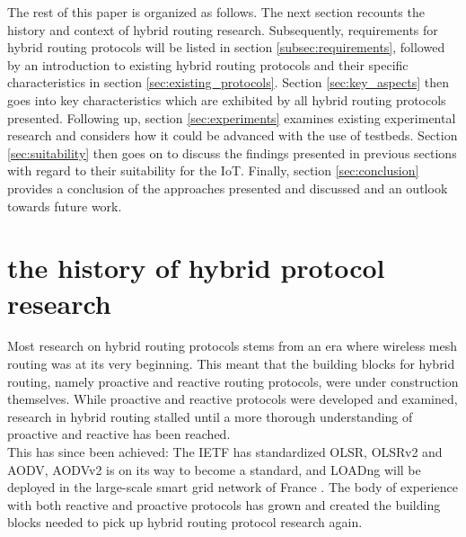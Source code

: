 \documentclass[a4paper,10pt]{scrartcl}
\begin{document}
The rest of this paper is organized as follows.
The next section recounts the history and context of hybrid routing research. Subsequently, requirements for hybrid routing protocols will be listed in section \ref{subsec:requirements}, followed by an introduction to existing hybrid routing protocols and their specific characteristics in section \ref{sec:existing_protocols}. Section \ref{sec:key_aspects} then goes into key characteristics which are exhibited by all hybrid routing protocols presented. Following up, section \ref{sec:experiments} examines existing experimental research and considers how it could be advanced with the use of testbeds. Section \ref{sec:suitability} then goes on to discuss the findings presented in previous sections with regard to their suitability for the IoT. Finally, section \ref{sec:conclusion} provides a conclusion of the approaches presented and discussed and an outlook towards future work.

\section{the history of hybrid protocol research}
\label{sec:related_work}
Most research on hybrid routing protocols stems from an era where wireless mesh routing was at its very beginning. This meant that the building blocks for hybrid routing, namely proactive and reactive routing protocols, were under construction themselves. While proactive and reactive protocols were developed and examined, research in hybrid routing stalled until a more thorough understanding of proactive and reactive has been reached.\\
This has since been achieved: The \gls{IETF} has standardized \gls{OLSR}\cite{RFC-3626}, OLSRv2\cite{RFC-7181} and \gls{AODV}\cite{RFC-3561}, AODVv2\cite{draft-ietf-manet-aodvv2-06} is on its way to become a standard, and \gls{LOADng}\cite{draft-yi-loadngct-02} will be deployed in the large-scale smart grid network of France \cite{X800}. The body of experience with both reactive and proactive protocols has grown and created the building blocks needed to pick up hybrid routing protocol research again.\\
\end{document}
